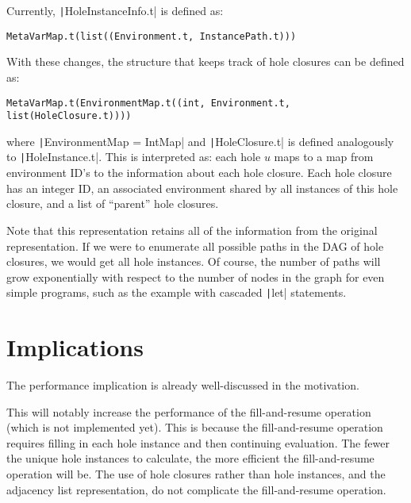 \documentclass{article}
\begin{document}
Currently, \texttt|HoleInstanceInfo.t| is defined as:

\begin{verbatim}
MetaVarMap.t(list((Environment.t, InstancePath.t)))
\end{verbatim}
With these changes, the structure that keeps track of hole closures can be defined as:
\begin{verbatim}
MetaVarMap.t(EnvironmentMap.t((int, Environment.t, list(HoleClosure.t))))
\end{verbatim}
where \texttt|EnvironmentMap = IntMap| and \texttt|HoleClosure.t| is defined analogously to \texttt|HoleInstance.t|. This is interpreted as: each hole $u$ maps to a map from environment ID's to the information about each hole closure. Each hole closure has an integer ID, an associated environment shared by all instances of this hole closure, and a list of ``parent'' hole closures.

Note that this representation retains all of the information from the original representation. If we were to enumerate all possible paths in the DAG of hole closures, we would get all hole instances. Of course, the number of paths will grow exponentially with respect to the number of nodes in the graph for even simple programs, such as the example with cascaded \texttt|let| statements.

\section{Implications}
The performance implication is already well-discussed in the motivation.

This will notably increase the performance of the fill-and-resume operation (which is not implemented yet). This is because the fill-and-resume operation requires filling in each hole instance and then continuing evaluation. The fewer the unique hole instances to calculate, the more efficient the fill-and-resume operation will be. The use of hole closures rather than hole instances, and the adjacency list representation, do not complicate the fill-and-resume operation.
\end{document}
